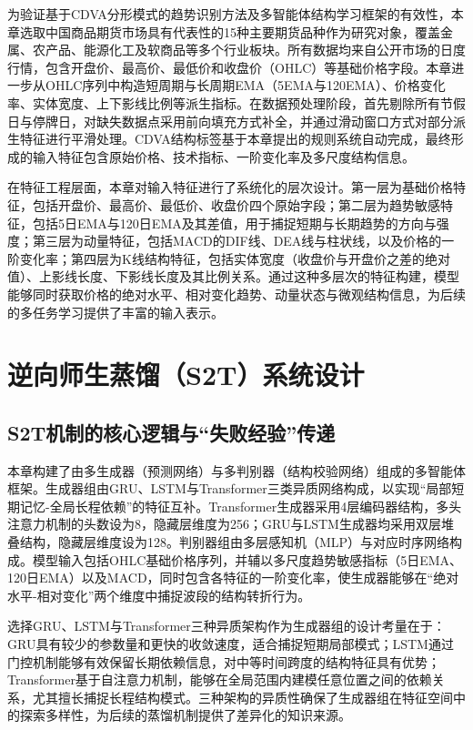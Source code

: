 为验证基于CDVA分形模式的趋势识别方法及多智能体结构学习框架的有效性，本章选取中国商品期货市场具有代表性的15种主要期货品种作为研究对象，覆盖金属、农产品、能源化工及软商品等多个行业板块。所有数据均来自公开市场的日度行情，包含开盘价、最高价、最低价和收盘价（OHLC）等基础价格字段。本章进一步从OHLC序列中构造短周期与长周期EMA（5EMA与120EMA）、价格变化率、实体宽度、上下影线比例等派生指标。在数据预处理阶段，首先剔除所有节假日与停牌日，对缺失数据点采用前向填充方式补全，并通过滑动窗口方式对部分派生特征进行平滑处理。CDVA结构标签基于本章提出的规则系统自动完成，最终形成的输入特征包含原始价格、技术指标、一阶变化率及多尺度结构信息。

在特征工程层面，本章对输入特征进行了系统化的层次设计。第一层为基础价格特征，包括开盘价、最高价、最低价、收盘价四个原始字段；第二层为趋势敏感特征，包括5日EMA与120日EMA及其差值，用于捕捉短期与长期趋势的方向与强度；第三层为动量特征，包括MACD的DIF线、DEA线与柱状线，以及价格的一阶变化率；第四层为K线结构特征，包括实体宽度（收盘价与开盘价之差的绝对值）、上影线长度、下影线长度及其比例关系。通过这种多层次的特征构建，模型能够同时获取价格的绝对水平、相对变化趋势、动量状态与微观结构信息，为后续的多任务学习提供了丰富的输入表示。

\section{逆向师生蒸馏（S2T）系统设计}

\subsection{S2T机制的核心逻辑与``失败经验''传递}

本章构建了由多生成器（预测网络）与多判别器（结构校验网络）组成的多智能体框架。生成器组由GRU、LSTM与Transformer三类异质网络构成，以实现``局部短期记忆-全局长程依赖''的特征互补。Transformer生成器采用4层编码器结构，多头注意力机制的头数设为8，隐藏层维度为256；GRU与LSTM生成器均采用双层堆叠结构，隐藏层维度设为128。判别器组由多层感知机（MLP）与对应时序网络构成。模型输入包括OHLC基础价格序列，并辅以多尺度趋势敏感指标（5日EMA、120日EMA）以及MACD，同时包含各特征的一阶变化率，使生成器能够在``绝对水平-相对变化''两个维度中捕捉波段的结构转折行为。

选择GRU、LSTM与Transformer三种异质架构作为生成器组的设计考量在于：GRU具有较少的参数量和更快的收敛速度，适合捕捉短期局部模式；LSTM通过门控机制能够有效保留长期依赖信息，对中等时间跨度的结构特征具有优势；Transformer基于自注意力机制，能够在全局范围内建模任意位置之间的依赖关系，尤其擅长捕捉长程结构模式。三种架构的异质性确保了生成器组在特征空间中的探索多样性，为后续的蒸馏机制提供了差异化的知识来源。

